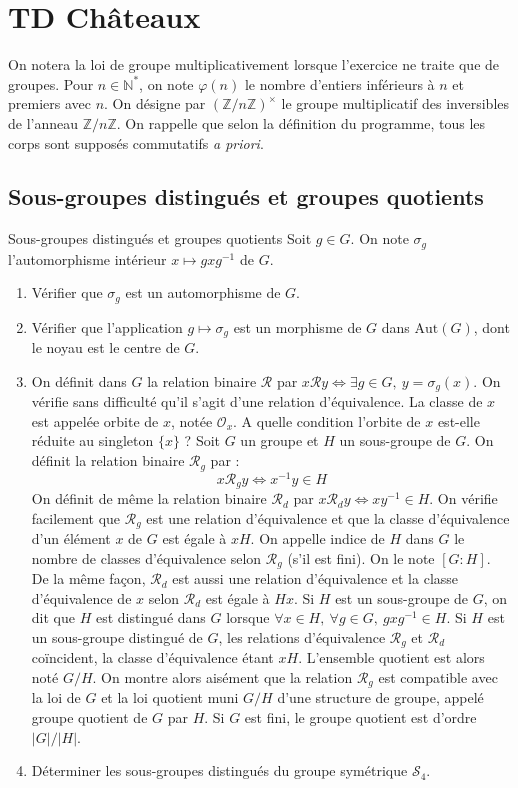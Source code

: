 \documentclass[french,a4paper]{article}
\newcommand{\N}{\mathbb{N}}
\newcommand{\Z}{\mathbb{Z}}
\newcommand{\st}{^*}
\newcommand{\inv}{^{-1}}
\theoremstyle{plain}
\theoremstyle{definition}
\theoremstyle{remark}
\begin{document}
\section{TD Châteaux}
On notera la loi de groupe multiplicativement lorsque l'exercice ne traite que de groupes. Pour $n\in\N\st$, on note $\varphi(n)$ le nombre d'entiers inférieurs à $n$ et premiers avec $n$. On désigne par $(\Z/n\Z)^\times$ le groupe multiplicatif des inversibles de l'anneau $\Z/n\Z$. On rappelle que selon la définition du programme, tous les corps sont supposés commutatifs \textit{a priori}.
\subsection{Sous-groupes distingués et groupes quotients}
\begin{ex}{Sous-groupes distingués et groupes quotients}
	Soit $g\in G$. On note $\sigma_g$ l'automorphisme intérieur $x\mapsto gxg\inv$ de $G$.
	\begin{enumerate}
		\item Vérifier que $\sigma_g$ est un automorphisme de $G$.
		\item Vérifier que l'application $g\mapsto\sigma_g$ est un morphisme de $G$ dans $\text{Aut}(G)$, dont le noyau est le centre de $G$.
		\item On définit dans $G$ la relation binaire $\mathcal{R}$ par $x\mathcal{R}y\iff \exists g\in G,\ y=\sigma_g(x)$. On vérifie sans difficulté qu'il s'agit d'une relation d'équivalence. La classe de $x$ est appelée orbite de $x$, notée $\mathcal{O}_x$. A quelle condition l'orbite de $x$ est-elle réduite au singleton $\{x\}$ ? Soit $G$ un groupe et $H$ un sous-groupe de $G$. On définit la relation binaire $\mathcal{R}_g$ par : $$x\mathcal{R}_gy\iff x\inv y\in H$$ On définit de même la relation binaire $\mathcal{R}_d$ par $x\mathcal{R}_dy\iff xy\inv\in H$. On vérifie facilement que $\mathcal{R}_g$ est une relation d'équivalence et que la classe d'équivalence d'un élément $x$ de $G$ est égale à $xH$. On appelle indice de $H$ dans $G$ le nombre de classes d'équivalence selon $\mathcal{R}_g$ (s'il est fini). On le note $[G:H]$. De la même façon, $\mathcal{R}_d$ est aussi une relation d'équivalence et la classe d'équivalence de $x$ selon $\mathcal{R}_d$ est égale à $Hx$. Si $H$ est un sous-groupe de $G$, on dit que $H$ est distingué dans $G$ lorsque $\forall x\in H,\ \forall g\in G,\ gxg\inv\in H$. Si $H$ est un sous-groupe distingué de $G$, les relations d'équivalence $\mathcal{R}_g$ et $\mathcal{R}_d$ coïncident, la classe d'équivalence étant $xH$. L'ensemble quotient est alors noté $G/H$. On montre alors aisément que la relation $\mathcal{R}_g$ est compatible avec la loi de $G$ et la loi quotient muni $G/H$ d'une structure de groupe, appelé groupe quotient de $G$ par $H$. Si $G$ est fini, le groupe quotient est d'ordre $\lvert G\rvert/\lvert H\rvert$.
		\item Déterminer les sous-groupes distingués du groupe symétrique $\mathcal{S}_4$.
	\end{enumerate}
\end{ex}
\end{document}

